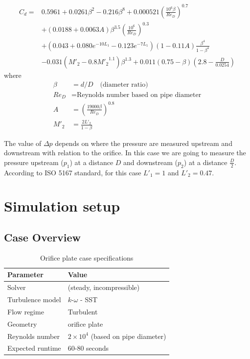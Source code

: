 \documentclass[
    parskip=half,      %
    DIV=12,            %
    headings=normal,   %
    fontsize=11pt,     %
    english            %
]{scrartcl}
\begin{document}
\begin{equation}
	\begin{split}
		C_d = & 0.5961 + 0.0261\beta^2 - 0.216\beta^8 + 0.000521\left(\frac{10^6\beta}{Re_D}\right)^{0.7} \\
		& + (0.0188 + 0.0063A)\beta^{3.5}\left(\frac{10^6}{Re_D}\right)^{0.3} \\
		& + (0.043 + 0.080e^{-10L_1} - 0.123e^{-7L_1})(1 - 0.11A)\frac{\beta^4}{1-\beta^4} \\
		& - 0.031(M'_2 - 0.8{M'_2}^{1.1})\beta^{1.3} + 0.011(0.75 - \beta)\left(2.8 - \frac{D}{0.0254}\right)
	\end{split}
\end{equation}
where
\begin{align*}
	\beta &= d/D \quad \text{(diameter ratio)}\\
	Re_D &= \text{Reynolds number based on pipe diameter}\\
	A &= \left(\frac{19000\beta}{Re_D}\right)^{0.8}\\
	M'_2 &= \frac{2L'_2}{1-\beta}
\end{align*}

The value of $\Delta p$ depends on where the pressure are measured upstream and downstream
with relation to the orifice. In this case we are going to measure the pressure upstream
($p_1$) at a distance $D$ and downstream ($p_2$) at a distance $\frac{D}{2}$.
According to ISO 5167 standard\cite{iso5167}, for this case $L'_1 = 1$ and $L'_2 = 0.47$. 


\section{Simulation setup}
\subsection{Case Overview}

\begin{table}[H]
	\centering
	\begin{tabular}{@{}ll@{}}
		\toprule
		\textbf{Parameter} & \textbf{Value} \\
		\midrule
		Solver & \terminalcmd{simpleFoam} (steady, incompressible) \\
		Turbulence model & $k$-$\omega$ - SST  \\
		Flow regime & Turbulent \\
		Geometry & orifice plate \\
		Reynolds number & $ 2 \times 10^4$ (based on pipe diameter) \\
		Expected runtime & 60-80 seconds \\
		\bottomrule
	\end{tabular}
	\caption{Orifice plate case specifications}
	\label{tab:case_specs}
\end{table}
\end{document}
